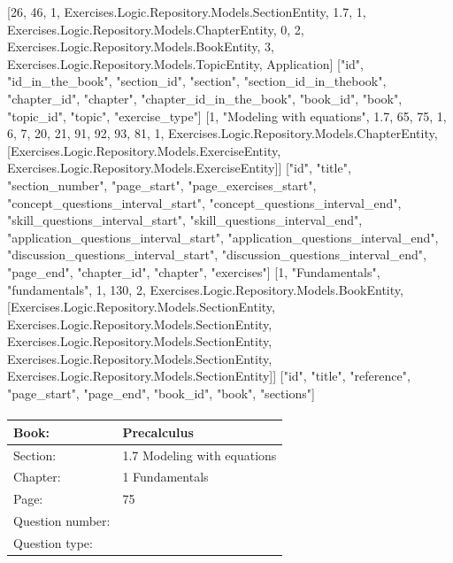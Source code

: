 \documentclass{article}
\begin{document}
    [26, 46, 1, Exercises.Logic.Repository.Models.SectionEntity, 1.7, 1, Exercises.Logic.Repository.Models.ChapterEntity, 0, 2, Exercises.Logic.Repository.Models.BookEntity, 3, Exercises.Logic.Repository.Models.TopicEntity, Application]
    ["id", "id_in_the_book", "section_id", "section", "section_id_in_thebook", "chapter_id", "chapter", "chapter_id_in_the_book", "book_id", "book", "topic_id", "topic", "exercise_type"]
    [1, "Modeling with equations", 1.7, 65, 75, 1, 6, 7, 20, 21, 91, 92, 93, 81, 1, Exercises.Logic.Repository.Models.ChapterEntity, [Exercises.Logic.Repository.Models.ExerciseEntity, Exercises.Logic.Repository.Models.ExerciseEntity]]
    ["id", "title", "section_number", "page_start", "page_exercises_start", "concept_questions_interval_start", "concept_questions_interval_end", "skill_questions_interval_start", "skill_questions_interval_end", "application_questions_interval_start", "application_questions_interval_end", "discussion_questions_interval_start", "discussion_questions_interval_end", "page_end", "chapter_id", "chapter", "exercises"]
    [1, "Fundamentals", "fundamentals", 1, 130, 2, Exercises.Logic.Repository.Models.BookEntity, [Exercises.Logic.Repository.Models.SectionEntity, Exercises.Logic.Repository.Models.SectionEntity, Exercises.Logic.Repository.Models.SectionEntity, Exercises.Logic.Repository.Models.SectionEntity, Exercises.Logic.Repository.Models.SectionEntity]]
    ["id", "title", "reference", "page_start", "page_end", "book_id", "book", "sections"]

   \paragraph{}
   \begin{tabularx}{1\textwidth}{
           p{}
           p{}
       }
       \toprule
       Book: & Precalculus
       \\
       \midrule
       Section: & 1.7 Modeling with equations
       \\
       \midrule
       Chapter: & 1 Fundamentals
       \\
       \midrule
       Page: & 75
       \\
       \midrule
       Question number: & 
       \\
       \midrule
       Question type: & 
       \\
       \bottomrule
   \end{tabularx}
\end{document}
